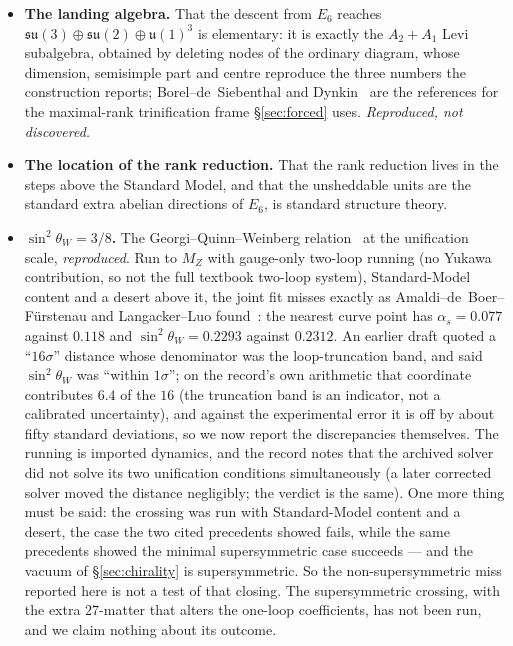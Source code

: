 \documentclass[11pt,a4paper]{article}
\theoremstyle{definition}
\theoremstyle{remark}
\begin{document}
\begin{itemize}[leftmargin=1.4em,itemsep=2pt]
\item \textbf{The landing algebra.} That the descent from $E_6$ reaches
$\mathfrak{su}(3)\oplus\mathfrak{su}(2)\oplus\mathfrak{u}(1)^3$ is elementary: it is exactly the $A_2{+}A_1$ Levi subalgebra, obtained by deleting nodes of the ordinary diagram, whose
dimension, semisimple part and centre reproduce the three numbers the construction reports; Borel--de~Siebenthal and
Dynkin~\cite{bds,dynkin} are the references for the maximal-rank trinification frame \S\ref{sec:forced} uses. \emph{Reproduced, not discovered.}
\item \textbf{The location of the rank reduction.} That the rank reduction lives in the steps above
the Standard Model, and that the unsheddable units are the standard extra abelian directions of
$E_6$, is standard structure theory.
\item \textbf{$\sin^2\theta_W = 3/8$.} The Georgi--Quinn--Weinberg relation~\cite{gqw} at the unification scale,
\emph{reproduced}. Run to $M_Z$ with gauge-only two-loop running (no Yukawa contribution, so not the full textbook two-loop system),
Standard-Model content and a desert above it, the joint fit misses exactly as Amaldi--de~Boer--F\"urstenau and Langacker--Luo found~\cite{adf,ll}: the
nearest curve point has $\alpha_s = 0.077$ against $0.118$ and $\sin^2\theta_W = 0.2293$ against $0.2312$. An earlier draft
quoted a ``$16\sigma$'' distance whose denominator was the loop-truncation band, and said $\sin^2\theta_W$ was ``within
$1\sigma$''; on the record's own arithmetic that coordinate contributes $6.4$ of the $16$ (the truncation band is an indicator, not a
calibrated uncertainty), and against the experimental error it is off by about fifty standard deviations, so we now report
the discrepancies themselves. The running is imported dynamics, and the record notes that the archived solver did not solve
its two unification conditions simultaneously (a later corrected solver moved the distance negligibly; the verdict is the same). One more thing must be said: the crossing
was run with Standard-Model content and a desert, the case the two cited precedents showed fails, while the same precedents
showed the minimal supersymmetric case succeeds --- and the vacuum of \S\ref{sec:chirality} is supersymmetric. So the
non-supersymmetric miss reported here is not a test of that closing. The supersymmetric crossing, with the extra $27$-matter
that alters the one-loop coefficients, has not been run, and we claim nothing about its outcome.

\end{itemize}
\end{document}
